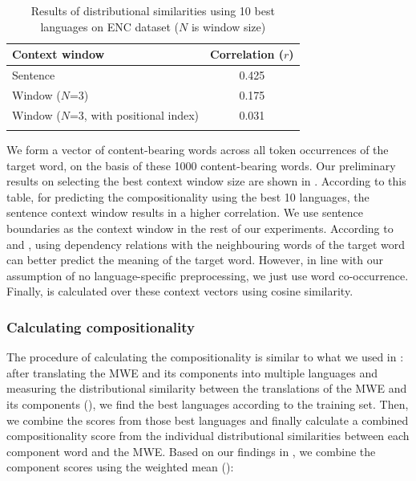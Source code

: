 \documentclass[output=paper,modfonts,nonflat]{langsci/langscibook}
\begin{document}
\begin{table}[t]

\begin{tabular}{l c} 
\lsptoprule
Context window &Correlation ($r$) \\\midrule
Sentence & 0.425 \\
Window ($N$=3) & 0.175 \\
Window ($N$=3, with positional index) & 0.031 \\
\lspbottomrule
\end{tabular}
\caption{\label{tab:ds:premResult} Results of distributional similarities using 10 best languages on ENC dataset ($N$ is window size)}

\end{table}


We form a vector of content-bearing words across all token occurrences
of the target word, on the basis of these 1000 content-bearing words. Our
preliminary results on selecting the best context window size are
shown in . According to this table, for
predicting the compositionality using the best 10 languages, the
sentence context window results in a higher correlation. We use
sentence boundaries as the context window in the rest of our
experiments. According to \citet{weeds2003} and
\citet{Pado:Lapata:2007}, using dependency relations with the
neighbouring words of the target word can better predict the meaning
of the target word. However, in line with our assumption of no
language-specific preprocessing, we just use word
co-occurrence. Finally,  is calculated over
these context vectors using cosine similarity.

\subsubsection{Calculating compositionality}
\label{sec:computing-compositionality}
The procedure of calculating the compositionality is similar to what
we used in : after translating the MWE and its
components into multiple languages and measuring the distributional
similarity between the translations of the MWE and its components
(), we find the best languages according to the
training set. Then, we combine the scores from those best languages
and finally calculate a combined compositionality score from the
individual distributional similarities between each component word and
the MWE. Based on our findings in , we combine the
component scores using the weighted mean ():
\end{document}
